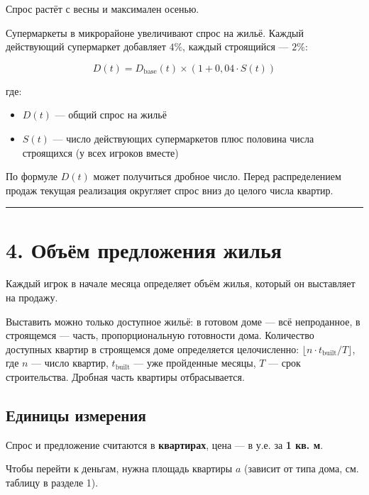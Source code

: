 \documentclass[
]{article}
\providecommand{\tightlist}{%
  \setlength{\itemsep}{0pt}\setlength{\parskip}{0pt}}
\begin{document}
Спрос растёт с весны и максимален осенью.

Супермаркеты в микрорайоне увеличивают спрос на жильё. Каждый
действующий супермаркет добавляет \(4\%\), каждый строящийся ---
\(2\%\):

\[
D(t)
=
D_{\text{base}}(t)
\times
\left(
1 + 0{,}04 \cdot S(t)
\right)
\]

где:

\begin{itemize}
\tightlist
\item
  \(D(t)\) --- общий спрос на жильё
\item
  \(S(t)\) --- число действующих супермаркетов плюс половина числа
  строящихся (у всех игроков вместе)
\end{itemize}

По формуле \(D(t)\) может получиться дробное число. Перед распределением
продаж текущая реализация округляет спрос вниз до целого числа квартир.

\begin{center}\rule{0.5\linewidth}{0.5pt}\end{center}

\section{4. Объём предложения
жилья}\label{ux43eux431ux44aux451ux43c-ux43fux440ux435ux434ux43bux43eux436ux435ux43dux438ux44f-ux436ux438ux43bux44cux44f}

Каждый игрок в начале месяца определяет объём жилья, который он
выставляет на продажу.

Выставить можно только доступное жильё: в готовом доме --- всё
непроданное, в строящемся --- часть, пропорциональную готовности дома.
Количество доступных квартир в строящемся доме определяется целочисленно:
\( \lfloor n \cdot t_{\text{built}}/T \rfloor \), где \(n\) --- число
квартир, \(t_{\text{built}}\) --- уже пройденные месяцы, \(T\) --- срок
строительства. Дробная часть квартиры отбрасывается.

\subsection{Единицы
измерения}\label{ux435ux434ux438ux43dux438ux446ux44b-ux438ux437ux43cux435ux440ux435ux43dux438ux44f}

Спрос и предложение считаются в \textbf{квартирах}, цена --- в у.е. за
\textbf{1 кв. м}.

Чтобы перейти к деньгам, нужна площадь квартиры \(a\) (зависит от типа
дома, см. таблицу в разделе 1).
\end{document}
